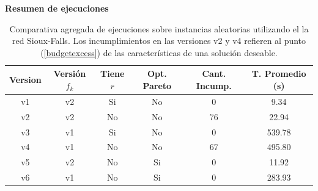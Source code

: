 \documentclass{article}
\begin{document}
  \begin{table}[h!]
    \centering
    \caption*{{\bf Resumen de ejecuciones}}
    \begin{tabular}{cccccc}
      \toprule
      Version & Versión $f_k$ & Tiene $r$ & Opt. Pareto & Cant. Incump. & T. Promedio (s) \\
      \midrule
      v1 & v2 & Si & No & 0   & 9.34    \\
      v2 & v2 & No & No & 76  & 22.94   \\
      v3 & v1 & Si & No & 0   & 539.78  \\
      v4 & v1 & No & No & 67  & 495.80  \\
      v5 & v2 & No & Si & 0   & 11.92   \\
      v6 & v1 & No & Si & 0   & 283.93  \\
      \bottomrule
    \end{tabular}
    \caption{Comparativa agregada de ejecuciones sobre instancias aleatorias utilizando el la red Sioux-Falls. Los incumplimientos en las versiones v2 y v4 refieren al punto (\ref{budgetexcess}) de las características de una solución deseable.}\label{table:resumenejecuciones}
  \end{table}
\end{document}
